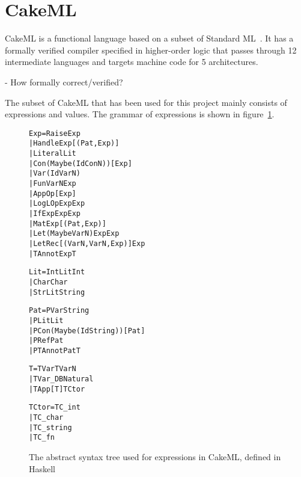 \section{CakeML}

CakeML is a functional language based on a subset of
Standard ML~\cite{CakeML25:online}. It has a
formally verified compiler specified in higher-order logic that passes through
12 intermediate languages and targets machine code for 5 architectures.

- How formally correct/verified?

The subset of CakeML that has been used for this project mainly
consists of expressions and values.
The grammar of expressions is shown in figure~\ref{CakeAST}.

\vspace{\fboxsep}
\begin{figure}
\begin{alltt}
  Exp   = Raise Exp
        | Handle Exp [(Pat, Exp)]
        | Literal Lit
        | Con (Maybe (Id ConN)) [Exp]
        | Var (Id VarN)
        | Fun VarN Exp
        | App Op [Exp]
        | Log LOp Exp Exp
        | If Exp Exp Exp
        | Mat Exp [(Pat, Exp)]
        | Let (Maybe VarN) Exp Exp
        | LetRec [(VarN, VarN, Exp)] Exp
        | TAnnot Exp T
\end{alltt}
\begin{alltt}
  Lit   = IntLit Int
        | Char Char
        | StrLit String
\end{alltt}
\begin{alltt}
  Pat   = PVar String
        | PLit Lit
        | PCon (Maybe (Id String)) [Pat]
        | PRef Pat
        | PTAnnot Pat T
\end{alltt}
\begin{alltt}
  T     = TVar TVarN
        | TVar_DB Natural
        | TApp [T] TCtor
\end{alltt}
\begin{alltt}
  TCtor = TC_int
        | TC_char
        | TC_string
        | TC_fn
\end{alltt}
\caption[CakeAST]{The abstract syntax tree used for expressions in CakeML, defined in Haskell}
\label{CakeAST}
\end{figure}
\vspace{\fboxsep}
